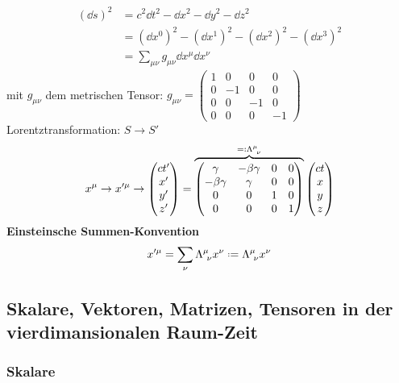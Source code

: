 \begin{align*}
(\dd s)^2 &= c^2 \dd t^2 - \dd x^2 - \dd y ^2 - \dd z^2\\
&= (\dd x^0)^2 - (\dd x^1)^2 - (\dd x^2)^2 - (\dd x^3)^2\\
&= \sum_{\mu \nu} g_{\mu \nu} \dd x^\mu \dd x^\nu
\end{align*}
mit $ g_{\mu \nu} $ dem metrischen Tensor: $ g_{\mu \nu} = \begin{pmatrix}
1 & 0 & 0 & 0 \\
0 & -1 & 0 & 0 \\
0 & 0 & -1 & 0 \\
0 & 0 & 0 & -1
\end{pmatrix} $
Lorentztransformation: $ S \to S' $
\begin{equation*}
x^\mu \to x'^{\mu} \to \begin{pmatrix}
ct' \\ x' \\ y' \\ z'
\end{pmatrix} = \ob{\begin{pmatrix}
\gamma & - \beta \gamma & 0 & 0 \\
- \beta \gamma & \gamma & 0 & 0 \\
0 & 0 & 1 & 0 \\
0 & 0 & 0 & 1
\end{pmatrix}}^{\eqdef \Lambda^{\mu}_{\ \nu}} \begin{pmatrix}
ct \\ x \\ y \\ z
\end{pmatrix}
\end{equation*}
\textbf{Einsteinsche Summen-Konvention}
\begin{equation*}
x'^{\mu} = \sum_{\nu} \Lambda^{\mu}_{\ \nu} x^{\nu} \defeq \Lambda^{\mu}_{\ \nu} x^{\nu}
\end{equation*}

\subsection{Skalare, Vektoren, Matrizen, Tensoren in der vierdimansionalen Raum-Zeit}

\subsubsection{Skalare}


